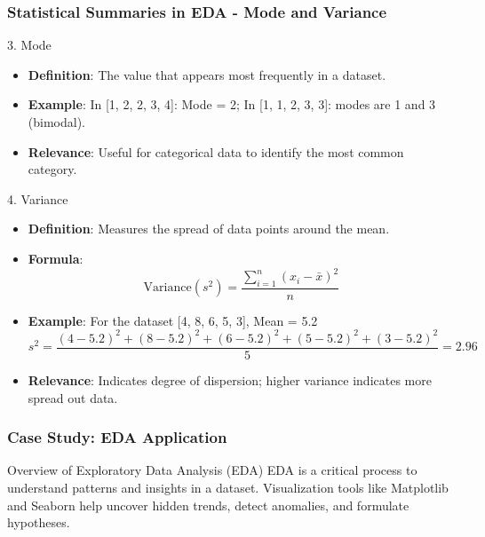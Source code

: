 \documentclass{beamer}
\begin{document}
\begin{frame}[fragile]
    \frametitle{Statistical Summaries in EDA - Mode and Variance}
    \begin{block}{3. Mode}
        \begin{itemize}
            \item \textbf{Definition}: The value that appears most frequently in a dataset.
            \item \textbf{Example}: In [1, 2, 2, 3, 4]: Mode = 2; In [1, 1, 2, 3, 3]: modes are 1 and 3 (bimodal).
            \item \textbf{Relevance}: Useful for categorical data to identify the most common category.
        \end{itemize}
    \end{block}

    \begin{block}{4. Variance}
        \begin{itemize}
            \item \textbf{Definition}: Measures the spread of data points around the mean.
            \item \textbf{Formula}:
            \begin{equation}
                \text{Variance} (s^2) = \frac{\sum_{i=1}^{n} (x_i - \bar{x})^2}{n}
            \end{equation}
            \item \textbf{Example}: For the dataset [4, 8, 6, 5, 3], Mean = 5.2
            \begin{equation}
                s^2 = \frac{(4-5.2)^2 + (8-5.2)^2 + (6-5.2)^2 + (5-5.2)^2 + (3-5.2)^2}{5} = 2.96
            \end{equation}
            \item \textbf{Relevance}: Indicates degree of dispersion; higher variance indicates more spread out data.
        \end{itemize}
    \end{block}
\end{frame}

\begin{frame}
    \frametitle{Case Study: EDA Application}
    \begin{block}{Overview of Exploratory Data Analysis (EDA)}
        EDA is a critical process to understand patterns and insights in a dataset.
        Visualization tools like Matplotlib and Seaborn help uncover hidden trends, detect anomalies, and formulate hypotheses.
    \end{block}
\end{frame}
\end{document}
